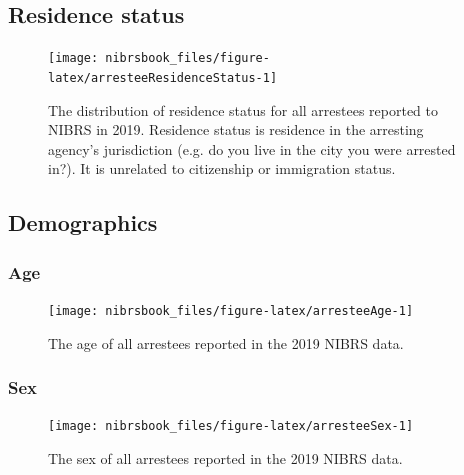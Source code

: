 \documentclass[
  12pt,
  openany]{book}
\begin{document}
\hypertarget{residence-status-1}{%
\subsection{Residence status}\label{residence-status-1}}

\begin{figure}

{\centering \texttt{[image: nibrsbook\_files/figure-latex/arresteeResidenceStatus-1]} 

}

\caption{The distribution of residence status for all arrestees reported to NIBRS in 2019. Residence status is residence in the arresting agency's jurisdiction (e.g. do you live in the city you were arrested in?). It is unrelated to citizenship or immigration status.}\label{fig:arresteeResidenceStatus}
\end{figure}

\hypertarget{demographics-2}{%
\subsection{Demographics}\label{demographics-2}}

\hypertarget{age-2}{%
\subsubsection{Age}\label{age-2}}

\begin{figure}

{\centering \texttt{[image: nibrsbook\_files/figure-latex/arresteeAge-1]} 

}

\caption{The age of all arrestees reported in the 2019 NIBRS data.}\label{fig:arresteeAge}
\end{figure}

\hypertarget{sex-2}{%
\subsubsection{Sex}\label{sex-2}}

\begin{figure}

{\centering \texttt{[image: nibrsbook\_files/figure-latex/arresteeSex-1]} 

}

\caption{The sex of all arrestees reported in the 2019 NIBRS data.}\label{fig:arresteeSex}
\end{figure}
\end{document}
